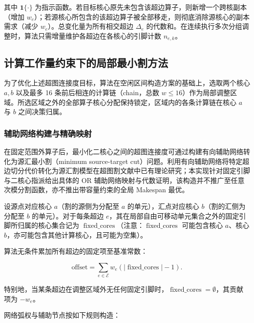 \documentclass[anonymous,notoc]{gmcm2026}
\begin{document}
其中 \(\mathbf{1}\{\cdot\}\) 为指示函数。若目标核心原先未包含该超边算子，则新增一个跨核副本（增加 \(w_e\)）；若源核心所包含的该超边算子被全部移走，则彻底消除源核心的副本需求（减少 \(w_e\)）。总变化量为所有相交超边 \(\Delta_e\) 的代数和。在连续执行多次分组调整时，算法只需增量维护各超边在各核心的引脚计数 \(n_{e, k}\)。

\subsection{计算工作量约束下的局部最小割方法}

为了优化上述超图连接度目标，算法在空闲区间构造方案的基础上，选取两个核心 \(a, b\) 以及最多 16 条前后相连的计算链（chain，总数 \(w \le 16\)）作为局部调整区域。所选区域之外的全部算子核心分配保持锁定，区域内的各条计算链在核心 \(a\) 与 \(b\) 之间决策归属。

\subsubsection{辅助网络构建与精确映射}

在固定范围外算子后，最小化二核心之间的超图连接度可通过构建有向辅助网络转化为源汇最小割（minimum source-target cut）问题。利用有向辅助网络将特定超边切分代价转化为源汇割模型在超图割文献中已有理论研究\cite{ref8}；本实现针对固定引脚与二核心指派给出具体的 OR 辅助网络映射与代数证明，该构造并不推广至任意次模分割函数，亦不推出带容量约束的全局 Makespan 最优。

设源点对应核心 \(a\)（割的源侧为分配至 \(a\) 的单元），汇点对应核心 \(b\)（割的汇侧为分配至 \(b\) 的单元）。对于每条超边 \(e\)，其在局部自由可移动单元集合之外的固定引脚所归属的核心集合记为 \(\operatorname{fixed\_cores}\)（注意：\(\operatorname{fixed\_cores}\) 可能包含核心 \(a\)、核心 \(b\)，亦可能包含其他计算核心，且可能为空集）。

算法无条件累加所有超边的固定项至基准常数：

\begin{equation}
\text{offset} = \sum_{e \in \mathcal{E}} w_e (|\operatorname{fixed\_cores}| - 1).
\end{equation}

特别地，当某条超边在调整区域外无任何固定引脚时，\(\operatorname{fixed\_cores} = \emptyset\)，其贡献项为 \(-w_e\)。

网络弧权与辅助节点按如下规则构造：
\end{document}
